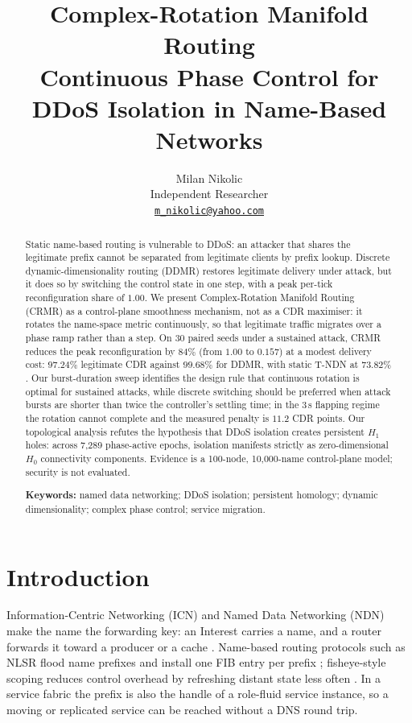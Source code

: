 \documentclass[10pt,a4paper]{article}
\title{\vspace{-1.2cm}\textbf{Complex-Rotation Manifold Routing}\\[2pt]
\large Continuous Phase Control for DDoS Isolation in Name-Based Networks}
\author{Milan Nikolic\\\small Independent Researcher\\\small \href{mailto:m_nikolic@yahoo.com}{\texttt{m\_nikolic@yahoo.com}}}
\date{}
\begin{document}
\maketitle

\begin{abstract}
\noindent
Static name-based routing is vulnerable to DDoS: an attacker that shares the
legitimate prefix cannot be separated from legitimate clients by prefix lookup.
Discrete dynamic-dimensionality routing (DDMR) restores legitimate delivery
under attack, but it does so by switching the control state in one step, with a
peak per-tick reconfiguration share of $1.00$.
We present Complex-Rotation Manifold Routing (CRMR) as a control-plane smoothness
mechanism, not as a CDR maximiser: it rotates the name-space metric continuously,
so that legitimate traffic migrates over a phase ramp rather than a step.
On 30 paired seeds under a sustained attack, CRMR reduces the peak reconfiguration
by $84\%$ (from $1.00$ to $0.157$) at a modest delivery cost: $97.24\%$
legitimate CDR against $99.68\%$ for DDMR, with static T-NDN at $73.82\%$.
Our burst-duration sweep identifies the design rule that continuous rotation is
optimal for sustained attacks, while discrete switching should be preferred when
attack bursts are shorter than twice the controller's settling time; in the
3\,s flapping regime the rotation cannot complete and the measured penalty is
$11.2$ CDR points.
Our topological analysis refutes the hypothesis that DDoS isolation creates
persistent $H_1$ holes: across 7{,}289 phase-active epochs, isolation manifests
strictly as zero-dimensional $H_0$ connectivity components.
Evidence is a 100-node, 10{,}000-name control-plane model; security is not
evaluated.

\vspace{4pt}
\noindent\textbf{Keywords:} named data networking; DDoS isolation; persistent
homology; dynamic dimensionality; complex phase control; service migration.
\end{abstract}

\section{Introduction}
\label{sec:intro}

Information-Centric Networking (ICN) and Named Data Networking (NDN) make the name
the forwarding key: an Interest carries a name, and a router forwards it toward a
producer or a cache \cite{zhang2014ndn}. Name-based routing protocols such as NLSR
flood name prefixes and install one FIB entry per prefix \cite{hoque2013nlsr};
fisheye-style scoping reduces control overhead by refreshing distant state less
often \cite{pei2000fsr}. In a service fabric the prefix is also the handle of a
role-fluid service instance, so a moving or replicated service can be reached
without a DNS round trip.
\end{document}

